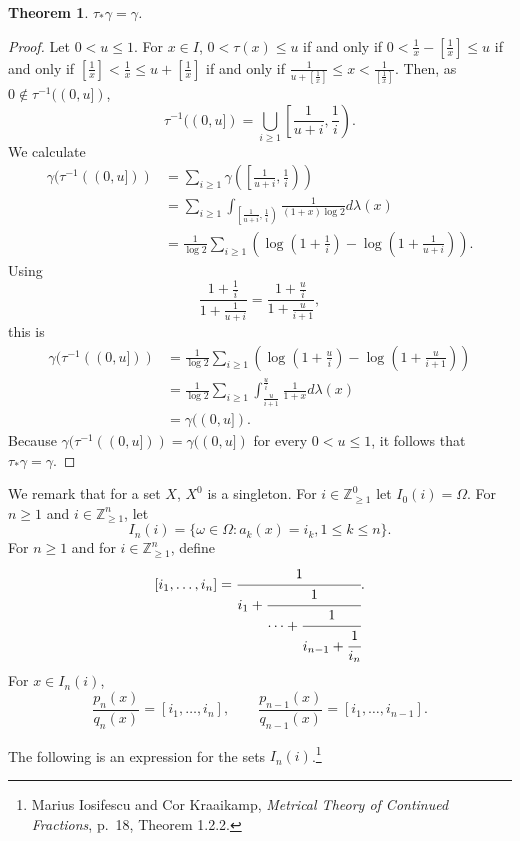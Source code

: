 \documentclass{article}
\newtheorem{theorem}{Theorem}
\theoremstyle{definition}
\begin{document}
\begin{theorem}
$\tau_*\gamma=\gamma$.
\end{theorem}
\begin{proof}
Let $0<u \leq 1$. For $x \in I$, $0<\tau(x) \leq u$ if and only if
$0<\frac{1}{x}-\left[\frac{1}{x}\right] \leq u$ if and only if
$\left[\frac{1}{x}\right] < \frac{1}{x} \leq u + \left[\frac{1}{x}\right]$ if
and only if
$\frac{1}{u + \left[\frac{1}{x}\right]} \leq x < \frac{1}{\left[\frac{1}{x}\right]}$. 
Then, as $0 \not \in \tau^{-1}((0,u])$, 
\[
\tau^{-1}((0,u]) = \bigcup_{i \geq 1} \left[ \frac{1}{u+i},\frac{1}{i}\right).
\]
We calculate
\begin{align*}
\gamma(\tau^{-1}((0,u]))&=\sum_{i \geq 1} \gamma\left( \left[ \frac{1}{u+i},\frac{1}{i}\right)\right)\\
&=\sum_{i \geq 1} \int_{\left[ \frac{1}{u+i},\frac{1}{i}\right)} \frac{1}{(1+x) \log 2} d\lambda(x)\\
&= \frac{1}{\log 2}  \sum_{i \geq 1}\left(\log\left(1+\frac{1}{i}\right)-\log\left(1+\frac{1}{u+i}\right)\right).
\end{align*}
Using
\[
\frac{1+\frac{1}{i}}{1+\frac{1}{u+i}} = \frac{1+\frac{u}{i}}{1+\frac{u}{i+1}},
\]
this is
\begin{align*}
\gamma(\tau^{-1}((0,u]))&= \frac{1}{\log 2}  \sum_{i \geq 1} \left( \log\left(1+\frac{u}{i}\right)-\log\left(1+\frac{u}{i+1}\right) \right)\\
&=\frac{1}{\log 2}  \sum_{i \geq 1} \int_{\frac{u}{i+1}}^{\frac{u}{i}} \frac{1}{1+x} d\lambda(x)\\
&=\gamma((0,u]).
\end{align*}
Because $\gamma(\tau^{-1}((0,u]))=\gamma((0,u])$ for every $0<u \leq 1$, it follows that $\tau_*\gamma=\gamma$.
\end{proof}


We remark that for a set $X$, $X^0$ is a singleton.
For $i \in \mathbb{Z}_{\geq 1}^0$ let $I_0(i)=\Omega$. 
For $n \geq 1$ and $i \in \mathbb{Z}_{\geq 1}^n$, 
let 
\[
I_n(i) = \{\omega \in \Omega: a_k(x) = i_k, 1 \leq k \leq n\}.
\]
For $n \geq 1$ and for $i \in \mathbb{Z}_{\geq 1}^n$, define
\[
[i_1,\ldots,i_n]=\cfrac{1}{i_1+\cfrac{1}{\cdots+\cfrac{1}{i_{n-1}+\cfrac{1}{i_n}}}}.
\]
For $x \in I_n(i)$, 
\[
\frac{p_n(x)}{q_n(x)} = [i_1,\ldots,i_n],
\qquad \frac{p_{n-1}(x)}{q_{n-1}(x)} = [i_1,\ldots,i_{n-1}].
\]


The following is an expression for the sets $I_n(i)$.\footnote{Marius Iosifescu and Cor Kraaikamp,
{\em Metrical Theory of Continued Fractions}, p.~18, Theorem 1.2.2.}
\end{document}
